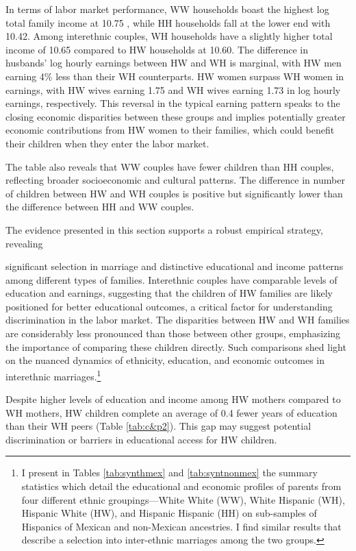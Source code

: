 In terms of labor market performance, WW households boast the highest log total family income at 10.75 , while HH households fall at the lower end with 10.42.  Among interethnic couples, WH households have a slightly higher total income of 10.65 compared to HW households at 10.60. The difference in husbands’ log hourly earnings between HW and WH is marginal, with HW men earning 4\% less than their WH counterparts. HW women surpass WH women in earnings, with HW wives earning 1.75 and WH wives earning 1.73 in log hourly earnings, respectively. This reversal in the typical earning pattern speaks to the closing economic disparities between these groups and implies potentially greater economic contributions from HW women to their families, which could benefit their children when they enter the labor market.

The table also reveals that WW couples have fewer children than HH couples, reflecting broader socioeconomic and cultural patterns. The difference in number of children between HW and WH couples is positive but significantly lower than the difference between HH and WW couples.

The evidence presented in this section supports a robust empirical strategy, revealing
 
significant selection in marriage and distinctive educational and income patterns among different types of families. Interethnic couples have comparable levels of education and earnings, suggesting that the children of HW families are likely positioned for better educational outcomes, a critical factor for understanding discrimination in the labor market. The disparities between HW and WH families are considerably less pronounced than those between other groups, emphasizing the importance of comparing these children directly. Such comparisons shed light on the nuanced dynamics of ethnicity, education, and economic outcomes in interethnic marriages.\footnote{I present in Tables \ref{tab:synthmex} and \ref{tab:syntnonmex} the summary statistics which detail the educational and economic profiles of parents from four different ethnic groupings—White White (WW), White Hispanic (WH), Hispanic White (HW), and Hispanic Hispanic (HH) on sub-samples of Hispanics of Mexican and non-Mexican ancestries. I find similar results that describe a selection into inter-ethnic marriages among the two groups.} 

Despite higher levels of education and income among HW mothers compared to WH mothers, HW children complete an average of 0.4 fewer years of education than their WH peers (Table \ref{tab:c&p2}). This gap may suggest potential discrimination or barriers in educational access for HW children.


